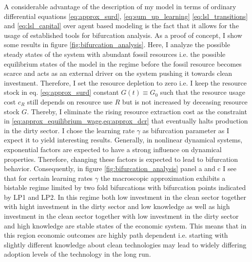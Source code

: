 A considerable advantage of the description of my model in terms of ordinary differential equations \eqref{eq:approx_surd}, \eqref{eq:sum_up_learning} \eqref{eq:lsl_transitions} and \eqref{eq:lsl_capital} over agent based modeling is the fact that it allows for the usage of established tools for bifurcation analysis.
As a proof of concept, I show some results in figure \ref{fig:bifurcation_analysis}.
Here, I analyze the possible steady states of the system with abundant fossil resources i.e. the possible equilibrium states of the model in the regime before the fossil resource becomes scarce and acts as an external driver on the system pushing it towards clean investment.
Therefore, I set the resource depletion to zero i.e. I keep the resource stock in eq. \eqref{eq:approx_surd} constant $G(t) \equiv G_0$ such that the resource usage cost $c_R$ still depends on resource use $R$ but is not increased by deceasing resource stock $G$. Thereby, I eliminate the rising resource extraction cost as the constraint in \cref{eq:approx_equilibrium_wage,eq:approx_dcr} that eventually halts production in the dirty sector. 
I chose the learning rate $\gamma$ as bifurcation parameter as I expect it to yield interesting results.
Generally, in nonlinear dynamical systems, exponential factors are expected to have a strong influence on dynamical properties. Therefore, changing these factors is expected to lead to bifurcation behavior.
Consequently, in figure \ref{fig:bifurcation_analysis} panel a and c I see that for certain learning rates $\gamma$ the macroscopic approximation exhibits a bistable regime limited by two fold bifurcations with bifurcation points indicated by LP1 and LP2.
In this regime both low investment in the clean sector together with hight investment in the dirty sector and low knowledge as well as high investment in the clean sector together with low investment in the dirty sector and high knowledge are stable states of the economic system. This means that in this region economic outcomes are highly path dependent i.e. starting with slightly different knowledge about clean technologies may lead to widely differing adoption levels of the technology in the long run.

